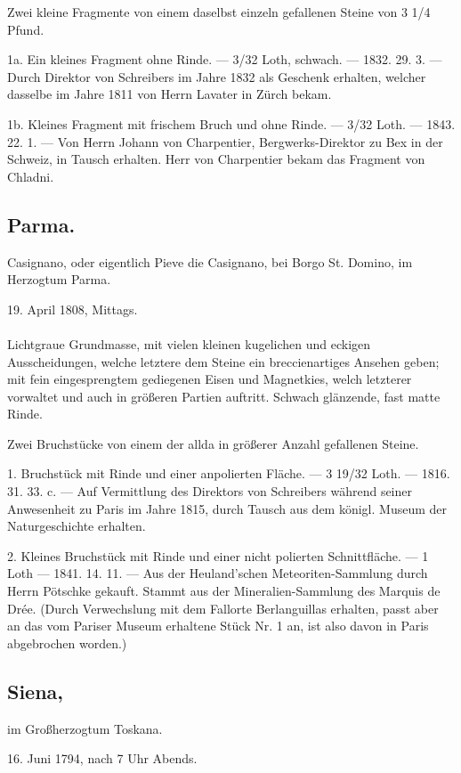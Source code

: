 \documentclass[a4paper, 11pt, oneside, polutonikogreek, german]{article}
\begin{document}
Zwei kleine Fragmente von einem daselbst einzeln gefallenen Steine von 3 1/4 Pfund.

1a. Ein kleines Fragment ohne Rinde. — 3/32 Loth, schwach. — 1832. 29. 3. — Durch Direktor von Schreibers im Jahre 1832 als Geschenk erhalten, welcher dasselbe im Jahre 1811 von Herrn Lavater in Zürch bekam.

1b. Kleines Fragment mit frischem Bruch und ohne Rinde. — 3/32 Loth. — 1843. 22. 1. — Von Herrn Johann von Charpentier, Bergwerks-Direktor zu Bex in der Schweiz, in Tausch erhalten. Herr von Charpentier bekam das Fragment von Chladni.
\subsection{Parma.}
\begin{center}
\small
Casignano, oder eigentlich Pieve die Casignano, bei Borgo St. Domino, im Herzogtum Parma.

19. April 1808, Mittags.
\end{center}
\paragraph{}
Lichtgraue Grundmasse, mit vielen kleinen kugelichen und eckigen Ausscheidungen, welche letztere dem Steine ein breccienartiges Ansehen geben; mit fein eingesprengtem gediegenen Eisen und Magnetkies, welch letzterer vorwaltet und auch in größeren Partien auftritt. Schwach glänzende, fast matte Rinde.

Zwei Bruchstücke von einem der allda in größerer Anzahl gefallenen Steine.

1. Bruchstück mit Rinde und einer anpolierten Fläche. — 3 19/32 Loth. — 1816. 31. 33. c. — Auf Vermittlung des Direktors von Schreibers während seiner Anwesenheit zu Paris im Jahre 1815, durch Tausch aus dem königl. Museum der Naturgeschichte erhalten.

2. Kleines Bruchstück mit Rinde und einer nicht polierten Schnittfläche. — 1 Loth — 1841. 14. 11. — Aus der Heuland'schen Meteoriten-Sammlung durch Herrn Pötschke gekauft. Stammt aus der Mineralien-Sammlung des Marquis de Drée. (Durch Verwechslung mit dem Fallorte Berlanguillas erhalten, passt aber an das vom Pariser Museum erhaltene Stück Nr. 1 an, ist also davon in Paris abgebrochen worden.)
\subsection[Siena.]{Siena,}
\begin{center}
\small
im Großherzogtum Toskana.

16. Juni 1794, nach 7 Uhr Abends.
\end{center}
\end{document}
